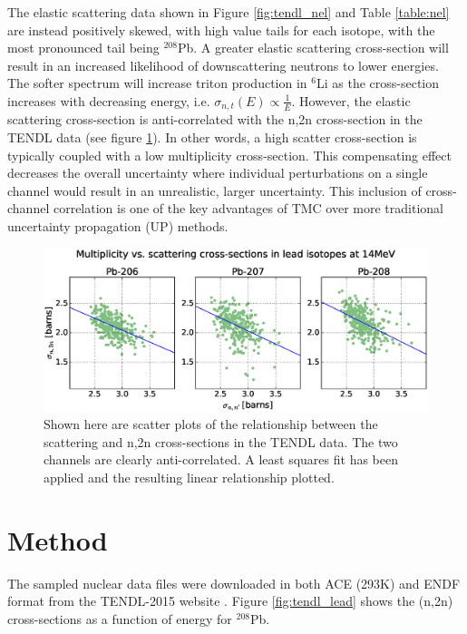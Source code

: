 The elastic scattering data shown in Figure \ref{fig:tendl_nel} and Table \ref{table:nel} are instead positively skewed, with high value tails for each isotope, with the most pronounced tail being $^{208}$Pb. A greater elastic scattering cross-section will result in an increased likelihood of downscattering neutrons to lower energies. The softer spectrum will increase triton production in $^{6}$Li as the cross-section increases with decreasing energy, i.e. $\sigma_{n,t}(E) \propto \frac{1}{E}$. However, the elastic scattering cross-section is anti-correlated with the n,2n cross-section in the TENDL data (see figure \ref{fig:pb_el_n2n_corr}). In other words, a high scatter cross-section is typically coupled with a low multiplicity cross-section. This compensating effect decreases the overall uncertainty where individual perturbations on a single channel would result in an unrealistic, larger uncertainty. This inclusion of cross-channel correlation is one of the key advantages of TMC over more traditional uncertainty propagation (UP) methods. 

\begin{figure}[ht]
	\includegraphics[width=\textwidth]{pb_el_n2n_corr}
  \caption{Shown here are scatter plots of the relationship between the scattering and n,2n cross-sections in the TENDL data. The two channels are clearly anti-correlated. A least squares fit has been applied and the resulting linear relationship plotted.}
	\label{fig:pb_el_n2n_corr}
\end{figure}

\section{Method}
The sampled nuclear data files were downloaded in both ACE (293K) and ENDF format from the TENDL-2015 website \cite{TENDL2015}. Figure \ref{fig:tendl_lead} shows the (n,2n) cross-sections as a function of energy for $^{208}$Pb. 

